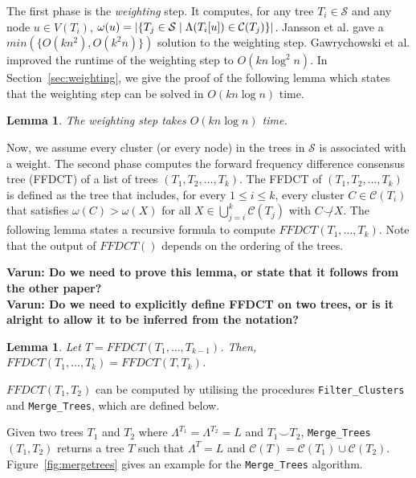 \documentclass[final,1p,times]{elsarticle}
\newcommand{\compatible}{\smile}
\newcommand{\leafset}{\Lambda}
\newcommand{\weight}{\omega}
\newtheorem{lemma}[theorem]{Lemma}
\begin{document}
    The first phase is the \textit{weighting} step. It computes, for any tree $T_i \in \mathcal{S}$ and any node $u \in V(T_i)$, $\weight(u) = | \{ T_j \in {\cal S} \mid \Lambda(T_i[u]) \in \mathcal{C}(T_j) \} |$. Jansson et al. \cite{jansson2018algorithms} gave a $min(\{O(kn^2), O(k^2n)\})$ solution to the weighting step.
    Gawrychowski et al. \cite{gawrychowski2017faster} improved the runtime of the weighting step to $O(kn \log^2n)$. In Section~\ref{sec:weighting}, we give the proof of the following lemma which states that the weighting step can be solved in $O(k n \log n)$ time.

    \begin{lemma}
	    \label{lem-weighting-time}
	   The weighting step takes $O(kn \log n)$ time.
    \end{lemma}

    Now, we assume every cluster (or every node) in the trees in $\mathcal{S}$ is associated with a weight. The second phase computes the forward frequency difference consensus tree (FFDCT) of a list of trees $(T_1, T_2, \ldots, T_k)$.
    The FFDCT of $(T_1, T_2, \ldots, T_k)$ is defined as the tree that includes, for every $1 \leq i \leq k$, every cluster $C \in \mathcal{C}(T_i)$ that satisfies $\weight(C) > \weight(X)$ for all $X \in \bigcup_{j=i}^k \mathcal{C}(T_j)$ with $C \not\compatible X$. The following lemma states a recursive formula to compute $FFDCT(T_1, \ldots, T_k)$. Note that the output of $FFDCT()$ depends on the ordering of the trees.

	{\bf Varun: Do we need to prove this lemma, or state that it follows from the other paper?}\\
	{\bf Varun: Do we need to explicitly define FFDCT on two trees, or is it alright to allow it to be inferred from the notation?}

    \begin{lemma} \label{lem-FFDCT}
	    Let $T = FFDCT(T_1, \ldots, T_{k-1})$. Then, $FFDCT(T_1, \ldots, T_k) = FFDCT(T, T_k)$.
    \end{lemma}

    $FFDCT(T_1, T_2)$ can be computed by utilising the procedures \texttt{Filter\_Clusters} and \texttt{Merge\_Trees}, which are defined below.

    Given two trees $T_1$ and $T_2$ where $\leafset^{T_1} = \leafset^{T_2} = L$ and $T_1 \compatible T_2$, \texttt{Merge\_Trees}$(T_1, T_2)$ returns a tree $T$ such that $\leafset^T = L$ and $\mathcal{C}(T) = \mathcal{C}(T_1) \cup \mathcal{C}(T_2)$. Figure~\ref{fig:mergetrees} gives an example for the \texttt{Merge\_Trees} algorithm.
\end{document}
